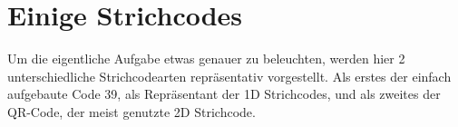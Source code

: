 \section{Einige Strichcodes}
\writtenby{\dcauthornameriren}%
Um die eigentliche Aufgabe etwas genauer zu beleuchten, werden hier 2 unterschiedliche Strichcodearten repräsentativ vorgestellt. Als erstes der einfach aufgebaute Code 39, als Repräsentant der 1D Strichcodes, und als zweites der QR-Code, der meist genutzte 2D Strichcode.




